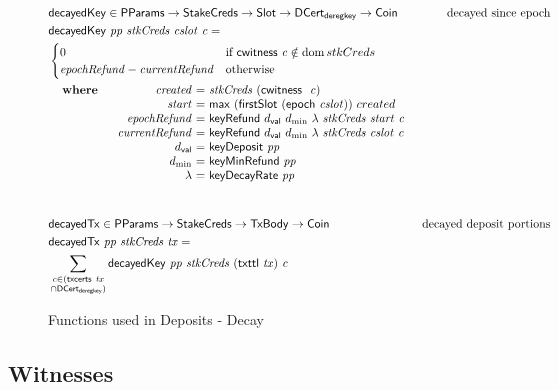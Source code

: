 \begin{figure}[htb]
  \begin{align*}
      & \fun{decayedKey} \in
      \PParams \to \StakeCreds \to \Slot \to \DCertDeRegKey \to \Coin
      & \text{decayed since epoch} \\
      & \decayedKey{pp}{stkCreds}{cslot}{c} =\\
      & \begin{cases}
            0 & \text{if}~\cwitness c \notin \dom stkCreds\\
            \var{epochRefund} - \var{currentRefund}
            & \text{otherwise}
        \end{cases}\\
      &
      \begin{array}{lr@{~=~}l}
        \where
          & \var{created} & \var{stkCreds}~(\cwitness~\var{c}) \\
          & \var{start} & \mathsf{max}~(\fun{firstSlot}~(\epoch{cslot}))~created \\
          & \var{epochRefund} & \keyRefund{\dval}{d_{\min}}{\lambda}{stkCreds}{start}{c} \\
          & \var{currentRefund} & \keyRefund{\dval}{d_{\min}}{\lambda}{stkCreds}{cslot}{c} \\
          & \dval & \fun{keyDeposit}~\var{pp}\\
          & d_{\min} & \fun{keyMinRefund}~\var{pp}\\
          & \lambda & \fun{keyDecayRate}~\var{pp}\\
      \end{array}\\
      \nextdef
      & \fun{decayedTx} \in \PParams \to \StakeCreds \to \TxBody \to \Coin
      & \text{decayed deposit portions} \\
      & \decayedTx{pp}{stkCreds}{tx} =\\
      &   \sum\limits_{\substack{c \in (\txcerts{tx} \\ \cap \DCertDeRegKey)}}
          \decayedKey{pp}{stkCreds}{(\txttl{tx})}{c}\\
  \end{align*}
  \caption{Functions used in Deposits - Decay}
  \label{fig:functions:deposits-decay}
\end{figure}

\clearpage

\subsection{Witnesses}
\label{sec:witnesses-shelley}

